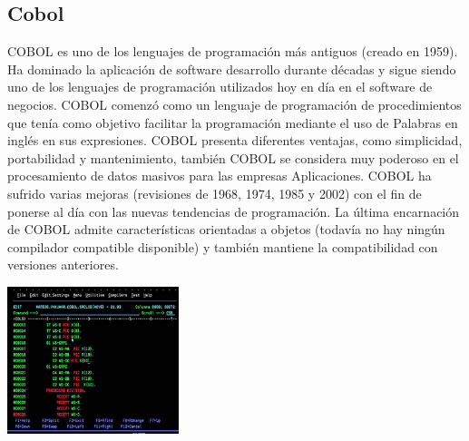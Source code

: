 \documentclass[twoside,twocolumn]{article}
\begin{document}
\subsection{Cobol}
COBOL es uno de los lenguajes de programación más antiguos (creado en 1959). Ha dominado la aplicación de software
desarrollo durante décadas y sigue siendo uno de los lenguajes de programación utilizados hoy en día en el software de negocios.
COBOL comenzó como un lenguaje de programación de procedimientos que tenía como objetivo facilitar la programación mediante el uso de
Palabras en inglés en sus expresiones. 
COBOL presenta diferentes ventajas, como simplicidad, portabilidad y
mantenimiento, también COBOL se considera muy poderoso en el procesamiento de datos masivos para las empresas
Aplicaciones. COBOL ha sufrido varias mejoras (revisiones de 1968, 1974, 1985 y 2002) con el fin de
ponerse al día con las nuevas tendencias de programación. La última encarnación de COBOL admite características orientadas a objetos
(todavía no hay ningún compilador compatible disponible) y también mantiene la compatibilidad con versiones anteriores.

\begin{center}
	\includegraphics[width=5cm]{./Imagenes/3} 
	\end{center}
\end{document}
